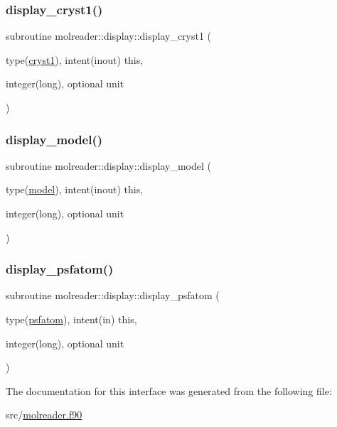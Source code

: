 \mbox{\label{interfacemolreader_1_1display_a367a91877524a939c53cd58ce8ac0635}} 
\subsubsection{\texorpdfstring{display\+\_\+cryst1()}{display\_cryst1()}}
{\footnotesize\ttfamily subroutine molreader\+::display\+::display\+\_\+cryst1 (\begin{DoxyParamCaption}\item[{type(\hyperlink{structmolreader_1_1cryst1}{cryst1}), intent(inout)}]{this,  }\item[{integer(long), optional}]{unit }\end{DoxyParamCaption})\hspace{0.3cm}{\ttfamily [private]}}

\mbox{\label{interfacemolreader_1_1display_af76b8884f32bae6a2a70d92dea1e884d}} 
\subsubsection{\texorpdfstring{display\+\_\+model()}{display\_model()}}
{\footnotesize\ttfamily subroutine molreader\+::display\+::display\+\_\+model (\begin{DoxyParamCaption}\item[{type(\hyperlink{structmolreader_1_1model}{model}), intent(inout)}]{this,  }\item[{integer(long), optional}]{unit }\end{DoxyParamCaption})\hspace{0.3cm}{\ttfamily [private]}}

\mbox{\label{interfacemolreader_1_1display_a0f0d826e10fcae2957860b21580f136a}} 
\subsubsection{\texorpdfstring{display\+\_\+psfatom()}{display\_psfatom()}}
{\footnotesize\ttfamily subroutine molreader\+::display\+::display\+\_\+psfatom (\begin{DoxyParamCaption}\item[{type(\hyperlink{structmolreader_1_1psfatom}{psfatom}), intent(in)}]{this,  }\item[{integer(long), optional}]{unit }\end{DoxyParamCaption})\hspace{0.3cm}{\ttfamily [private]}}



The documentation for this interface was generated from the following file\+:\begin{DoxyCompactItemize}
\item 
src/\hyperlink{molreader_8f90}{molreader.\+f90}\end{DoxyCompactItemize}
